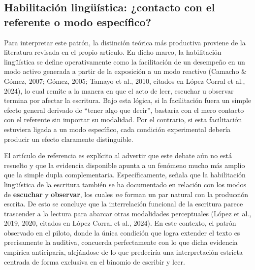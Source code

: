 \documentclass[12pt]{article}
\begin{document}
	\subsection{Habilitación lingüística: ¿contacto con el referente o modo específico?}
	
	Para interpretar este patrón, la distinción teórica más productiva proviene de la literatura revisada en el propio artículo. En dicho marco, la habilitación lingüística se define operativamente como la facilitación de un desempeño en un modo activo generada a partir de la exposición a un modo reactivo (Camacho \& Gómez, 2007; Gómez, 2005; Tamayo et al., 2010, citados en López Corral et al., 2024), lo cual remite a la manera en que el acto de leer, escuchar u observar termina por afectar la escritura. Bajo esta lógica, si la facilitación fuera un simple efecto general derivado de ``tener algo que decir'', bastaría con el mero contacto con el referente sin importar su modalidad. Por el contrario, si esta facilitación estuviera ligada a un modo específico, cada condición experimental debería producir un efecto claramente distinguible.
	
	El artículo de referencia es explícito al advertir que este debate aún no está resuelto y que la evidencia disponible apunta a un fenómeno mucho más amplio que la simple dupla complementaria. Específicamente, señala que la habilitación lingüística de la escritura también se ha documentado en relación con los modos de \textbf{escuchar} y \textbf{observar}, los cuales \emph{no} forman un par natural con la producción escrita. De esto se concluye que la interrelación funcional de la escritura parece trascender a la lectura para abarcar otras modalidades perceptuales (López et al., 2019, 2020, citados en López Corral et al., 2024). En este contexto, el patrón observado en el piloto, donde la única condición que logra extender el texto es precisamente la auditiva, concuerda perfectamente con lo que dicha evidencia empírica anticiparía, alejándose de lo que predeciría una interpretación estricta centrada de forma exclusiva en el binomio de escribir y leer.
	
\end{document}
